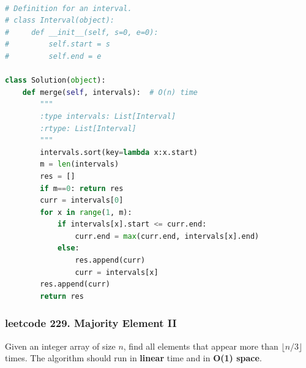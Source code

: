 \documentclass[a4paper,10pt]{article}
\begin{document}
\begin{lstlisting}[language=Python, caption=Problem56. Merge Intervals]

# Definition for an interval.
# class Interval(object):
#     def __init__(self, s=0, e=0):
#         self.start = s
#         self.end = e

class Solution(object):
    def merge(self, intervals):  # O(n) time
        """
        :type intervals: List[Interval]
        :rtype: List[Interval]
        """
        intervals.sort(key=lambda x:x.start)
        m = len(intervals)
        res = []
        if m==0: return res
        curr = intervals[0]
        for x in range(1, m):
            if intervals[x].start <= curr.end:
                curr.end = max(curr.end, intervals[x].end)
            else:
                res.append(curr)
                curr = intervals[x]
        res.append(curr)
        return res
\end{lstlisting}


\subsubsection{leetcode 229. Majority Element II}
Given an integer array of size $n$, find all elements that appear more than $\lfloor n/3 \rfloor$ times. The algorithm should run in \textbf{linear} time and in \textbf{O(1) space}. \\

\end{document}
